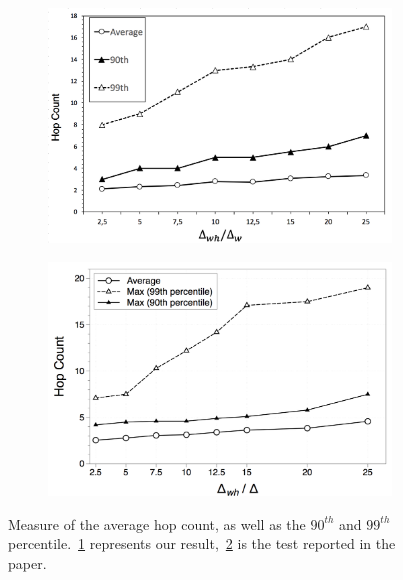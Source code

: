 \begin{figure}
\centering
\begin{subfigure}{.5\textwidth}
  \centering
  \includegraphics[keepaspectratio=true, width=1\linewidth]{images/average_hop_count}
  \caption{}
  \label{fig:my_average_hop_count}
\end{subfigure}%
\begin{subfigure}{.5\textwidth}
  \centering
  \includegraphics[keepaspectratio=true, width=1\linewidth]{images/paper_average_hop_count}
  \caption{}
  \label{fig:paper_average_hop_count}
\end{subfigure}
\caption{Measure of the average hop count, as well as the $90^{th}$ and $99^{th}$ percentile.~\ref{fig:my_average_hop_count} represents our result,~\ref{fig:paper_average_hop_count} is the test reported in the paper.}
\label{fig:freshness}
\end{figure}


